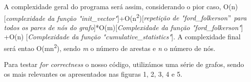 \documentclass[a4paper]{article}
\begin{document}
A complexidade geral do programa será assim, considerando o pior caso, O(n)[\textit{complexidade da função "init\_vector"}]+O(n\textsuperscript{2})[\textit{repetição de "ford\_folkerson$"$ para todos os pares de nós do grafo}]*O(m)[\textit{Complexidade da função "ford\_folkerson"}] +O(n) [\textit{Complexidade da função "cumulative\_statistics"}]. A complexidade final será entao O(mn\textsuperscript{2}), sendo \textit{m} o número de arestas e \textit{n} o número de nós.

Para testar \textit{for correctness} o nosso código, utilizámos uma série de grafos, sendo os mais relevantes os apresentados nas figuras 1, 2, 3, 4 e 5.
\end{document}
